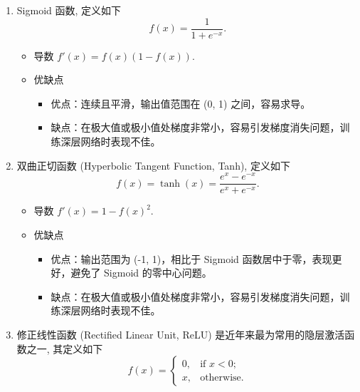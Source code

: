 \documentclass[8pt]{article}
\begin{document}
\begin{enumerate}
    \item Sigmoid 函数, 定义如下
    \begin{equation}
        f(x) = \frac{1}{1 + e^{-x}}.
        \label{eq:sigmoid}
    \end{equation}

    \begin{itemize}
        \item 导数 $f'(x) = f(x)(1 - f(x))$.
        \item 优缺点
        \begin{itemize}
            \item 优点：连续且平滑，输出值范围在 (0, 1) 之间，容易求导。
            \item 缺点：在极大值或极小值处梯度非常小，容易引发梯度消失问题，训练深层网络时表现不佳。
        \end{itemize}
    \end{itemize}

    \item 双曲正切函数 (Hyperbolic Tangent Function, Tanh), 定义如下
    \begin{equation}
        f(x) = \tanh(x) = \frac{e^x - e^{-x}}{e^x + e^{-x}}.
        \label{eq:tanh}
    \end{equation}

    \begin{itemize}
        \item 导数 $f'(x) = 1 - f(x)^2$.
        \item 优缺点
        \begin{itemize}
            \item 优点：输出范围为 (-1, 1)，相比于 Sigmoid 函数居中于零，表现更好，避免了 Sigmoid 的零中心问题。
            \item 缺点：在极大值或极小值处梯度非常小，容易引发梯度消失问题，训练深层网络时表现不佳。
        \end{itemize}
    \end{itemize}

    \item 修正线性函数 (Rectified Linear Unit, ReLU) 是近年来最为常用的隐层激活函数之一, 其定义如下
    \begin{equation}
        f(x) = \begin{cases}
            0, & \text{if } x < 0; \\
            x, & \text{otherwise}.
        \end{cases}
        \label{eq:relu}
    \end{equation}


\end{enumerate}
\end{document}

